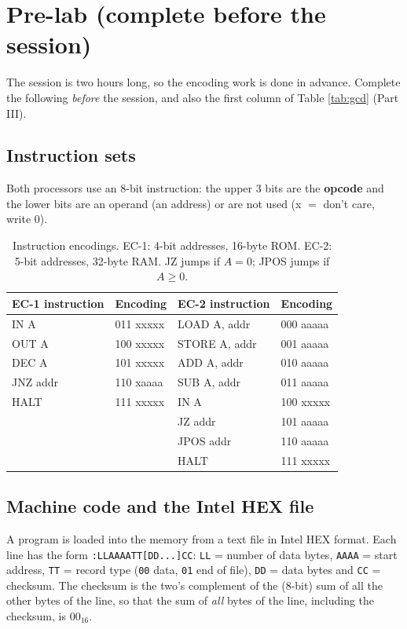 \documentclass{article}
\begin{document}
\section*{Pre-lab (complete before the session)}
The session is two hours long, so the encoding work is done in advance. Complete the following \emph{before} the session, and also the first column of Table \ref{tab:gcd} (Part III).
\subsection*{Instruction sets}
Both processors use an 8-bit instruction: the upper 3 bits are the \textbf{opcode} and the lower bits are an operand (an address) or are not used (x $=$ don't care, write 0).

\begin{table}[H]
    \centering
    \begin{tabular}{|l|l|l|l|}
        \hline
        \textbf{EC-1 instruction} & \textbf{Encoding} & \textbf{EC-2 instruction} & \textbf{Encoding} \\
        \hline
        IN A & 011 xxxxx & LOAD A, addr & 000 aaaaa \\
        OUT A & 100 xxxxx & STORE A, addr & 001 aaaaa \\
        DEC A & 101 xxxxx & ADD A, addr & 010 aaaaa \\
        JNZ addr & 110 xaaaa & SUB A, addr & 011 aaaaa \\
        HALT & 111 xxxxx & IN A & 100 xxxxx \\
        & & JZ addr & 101 aaaaa \\
        & & JPOS addr & 110 aaaaa \\
        & & HALT & 111 xxxxx \\
        \hline
    \end{tabular}
    \caption{Instruction encodings. EC-1: 4-bit addresses, 16-byte ROM. EC-2: 5-bit addresses, 32-byte RAM. JZ jumps if $A = 0$; JPOS jumps if $A \ge 0$.}
    \label{tab:isa}
\end{table}

\subsection*{Machine code and the Intel HEX file}
A program is loaded into the memory from a text file in Intel HEX format. Each line has the form \texttt{:LLAAAATT[DD...]CC}: \texttt{LL} = number of data bytes, \texttt{AAAA} = start address, \texttt{TT} = record type (\texttt{00} data, \texttt{01} end of file), \texttt{DD} = data bytes and \texttt{CC} = checksum. The checksum is the two's complement of the (8-bit) sum of all the other bytes of the line, so that the sum of \emph{all} bytes of the line, including the checksum, is $00_{16}$.
\end{document}
